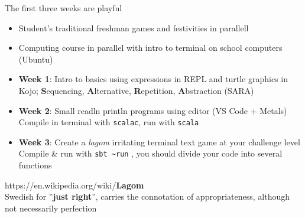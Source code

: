 \documentclass[aspectratio=169]{beamer}
\newcommand{\code}{\lstinline[basicstyle=\ttfamily]}
\newenvironment{Slide}[1]%
  {\begin{frame}[environment=Slide]{#1}}
  {\end{frame}}%
\begin{document}
\begin{Slide}{The first three weeks are playful}
  
  \begin{itemize}
    \item Student's traditional freshman games and festivities in parallell
    \item Computing course in parallel with intro to terminal on school computers (Ubuntu)
    \item \textbf{Week 1}: Intro to basics using expressions in REPL and turtle graphics in Kojo; \textbf{S}equencing, \textbf{A}lternative, \textbf{R}epetition, \textbf{A}bstraction (SARA)%
    \begin{minipage}{0.3\textwidth}
      
    \end{minipage} 
 
    \item \textbf{Week 2}: Small readln println programs using editor (VS Code + Metals)\\ Compile in terminal with \code|scalac|, run with \code|scala|
      
    \item \textbf{Week 3}: Create a \textit{lagom} irritating terminal text game at your challenge level \\ Compile \& run with \code|sbt ~run| , you should divide your code into several functions   
  \end{itemize}
\footnotesize{https://en.wikipedia.org/wiki/\textbf{Lagom} \\ Swedish for ''\textbf{just right}'', carries the connotation of appropriateness, although not necessarily perfection}
\end{Slide}  
\end{document}
